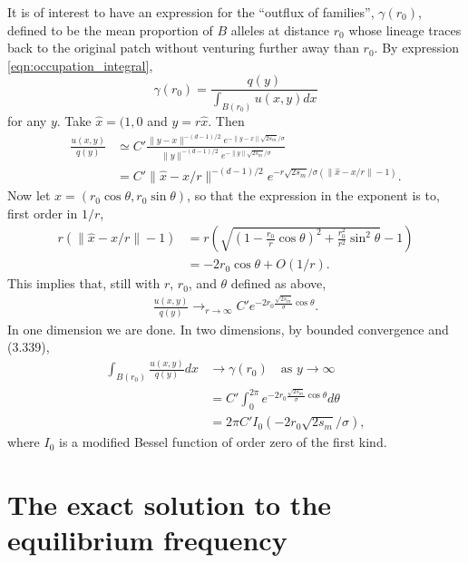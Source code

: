 \documentclass{article}
\newcommand{\citet}[1]{\cite{#1}}
\begin{document}
It is of interest to have an expression for the ``outflux of families'',
$\gamma(r_0)$, 
defined to be the mean proportion of $B$ alleles at distance $r_0$
whose lineage traces back to the original patch without venturing further away than $r_0$.
By expression \eqref{eqn:occupation_integral},
\[
    \gamma(r_0) = \frac{q(y)}{\int_{B(r_0)} u(x,y) dx}
\]
for any $y$.  
Take $\hat x = (1,0$ and $y=r \hat x$.  Then
\begin{align}
  \frac{ u(x,y) }{ q(y) } &\simeq C' \frac{ \|y-x\|^{-(d-1)/2} e^{-\|y-x\| \sqrt{2s_m}/\sigma } }{ \|y\|^{-(d-1)/2} e^{-\|y\| \sqrt{2s_m}/\sigma } } \\
  &= C' \| \hat x - x/r \|^{-(d-1)/2} e^{-r \sqrt{2s_m}/\sigma  (\|\hat x - x/r\| - 1)} .
\end{align}
Now let $x = (r_0 \cos \theta, r_0 \sin \theta)$,
so that the expression in the exponent is to, first order in $1/r$,
\begin{align}
    r (\|\hat x - x/r\| - 1) &= r \left( \sqrt{ \left( 1 - \frac{r_0}{r} \cos \theta \right)^2 + \frac{r_0^2}{r^2} \sin^2 \theta } - 1 \right ) \\
            &= - 2 r_0 \cos \theta + O(1/r) .
\end{align}
This implies that, still with $r$, $r_0$, and $\theta$ defined as above,
\begin{align}
  \frac{u(x,y)}{q(y)} \longrightarrow_{r \to \infty} C' e^{-2 r_0 \frac{\sqrt{2s_m}}{\sigma} \cos \theta} .
\end{align}
In one dimension we are done.
In two dimensions,
by bounded convergence and \citet{gradshteyn2007table} (3.339),
\begin{align}
  \int_{B(r_0)} \frac{u(x,y)}{q(y)} dx &\to \gamma(r_0) \quad \text{as } y \to \infty\\
  &= C' \int_0^{2 \pi} e^{-2 r_0 \frac{\sqrt{2s_m}}{\sigma} \cos \theta} d\theta \\
  &= 2 \pi C' I_0(-2r_0\sqrt{2 s_m}/\sigma),
\end{align}
where $I_0$ is a modified Bessel function of order zero of the first kind.






\appendix

\setcounter{secnumdepth}{2}

\section{The exact solution to the equilibrium frequency}
\label{apx:elliptic_integrals}
\end{document}
